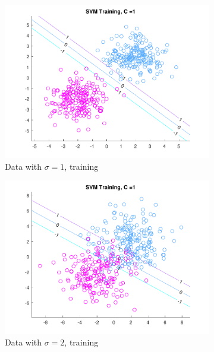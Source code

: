 \begin{figure}[h!]
\centering
    \begin{subfigure}[b]{0.4\textwidth}
	\includegraphics[scale=0.4]{figures/hw2_2_stdev1_a_1.pdf}
	\caption{Data with $\sigma = 1$, training}\label{fig:svm_data_stdev1a}
    \end{subfigure}
    \begin{subfigure}[b]{0.4\textwidth}
	\includegraphics[scale=0.4]{figures/hw2_2_stdev2_a_1.pdf}
	\caption{Data with $\sigma = 2$, training}\label{fig:svm_data_stdev2a}
    \end{subfigure}
    \begin{subfigure}[b]{0.4\textwidth}

\end{subfigure}
\end{figure}
